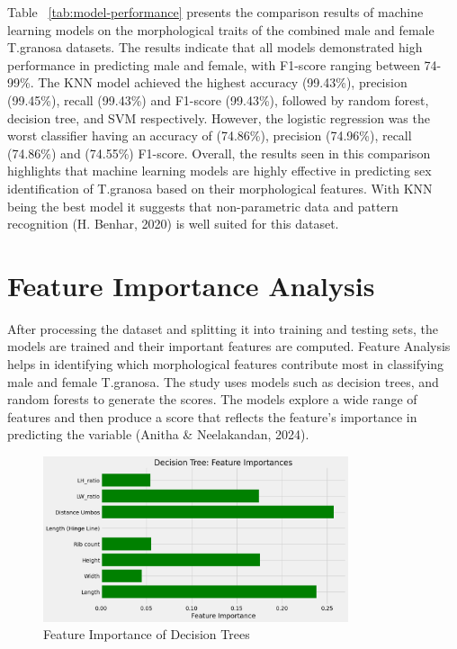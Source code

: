 Table ~\ref{tab:model-performance} presents the comparison results of machine learning models on the morphological traits of the combined  male and female T.granosa datasets. The results indicate that all models demonstrated high performance in predicting male and female, with F1-score ranging between 74-99\%. The KNN model achieved the highest accuracy (99.43\%), precision (99.45\%), recall (99.43\%) and F1-score (99.43\%), followed by random forest, decision tree, and SVM respectively. However, the logistic regression was the worst classifier having an accuracy of (74.86\%), precision (74.96\%), recall (74.86\%) and (74.55\%) F1-score. Overall, the results seen in this comparison highlights that machine learning models are highly effective in predicting sex identification of T.granosa based on their morphological features. With KNN being the best model it suggests that non-parametric data and pattern recognition (H. Benhar, 2020) is well suited for this dataset. 

\section{Feature Importance Analysis}
After processing the dataset and splitting it into training and testing sets, the models are trained and their important features are computed. Feature Analysis helps in identifying which morphological features contribute most in classifying male and female T.granosa. The study uses models such as decision trees, and random forests to generate the scores. The models explore a wide range of features and then produce a score that reflects the feature’s importance in predicting the variable (Anitha \& Neelakandan, 2024).  

\begin{figure}[!htbp]
	\centering
	\includegraphics[width=0.8\textwidth]{figures/decision-trees.png}
	\caption{Feature Importance of Decision Trees}
	\label{fig:decision-trees}
\end{figure}

